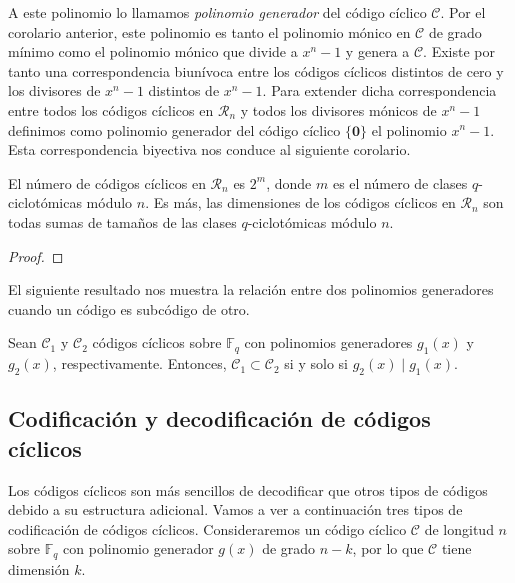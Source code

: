 A este polinomio lo llamamos \textit{polinomio generador} del código cíclico \(\mathcal C\).
Por el corolario anterior, este polinomio es tanto el polinomio mónico en \(\mathcal C\) de grado mínimo como el polinomio mónico que divide a \(x^n - 1\) y genera a \(\mathcal C\).
Existe por tanto una correspondencia biunívoca entre los códigos cíclicos distintos de cero y los divisores de \(x^n - 1\) distintos de \(x^n - 1\).
Para extender dicha correspondencia entre todos los códigos cíclicos en \(\mathcal R_n\) y todos los divisores mónicos de \(x^n - 1\) definimos como polinomio generador del código cíclico \(\{\boldsymbol 0\}\) el polinomio \(x^n - 1\). 
Esta correspondencia biyectiva nos conduce al siguiente corolario.

\begin{corollary}
  El número de códigos cíclicos en \(\mathcal R_n\) es \(2^m\), donde \(m\) es el número de clases \(q\)-ciclotómicas módulo \(n\).
  Es más, las dimensiones de los códigos cíclicos en \(\mathcal R_n\) son todas sumas de tamaños de las clases \(q\)-ciclotómicas módulo \(n\).
\end{corollary}

\begin{proof}
\end{proof}


El siguiente resultado nos muestra la relación entre dos polinomios generadores cuando un código es subcódigo de otro.

\begin{corollary}
  Sean \(\mathcal C_1\) y \(\mathcal C_2\) códigos cíclicos sobre \(\mathbb F_q\) con polinomios generadores \(g_1(x)\) y \(g_2(x)\), respectivamente.
  Entonces, \(\mathcal C_1 \subset \mathcal C_2 \) si y solo si \(g_2(x) \mid g_1(x)\).
\end{corollary}


\subsection{Codificación y decodificación de códigos cíclicos}

Los códigos cíclicos son más sencillos de decodificar que otros tipos de códigos debido a su estructura adicional.
Vamos a ver a continuación tres tipos de codificación de códigos cíclicos.
Consideraremos un código cíclico \(\mathcal C\) de longitud \(n\) sobre \(\mathbb F_q\) con polinomio generador \(g(x)\) de grado \(n - k\), por lo que \(\mathcal C\) tiene dimensión \(k\).

